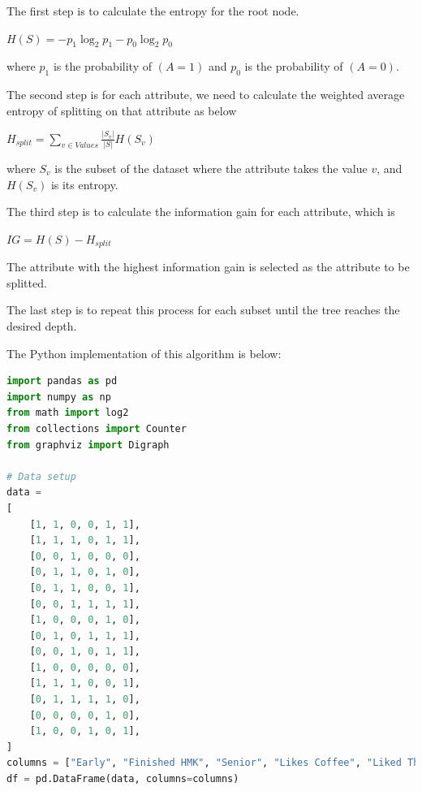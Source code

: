 \documentclass[12pt,letterpaper, onecolumn]{exam}
\begin{document}
\begin{questions}
\begin{parts}
\begin{solution}
        The first step is to calculate the entropy for the root node.

        \begin{center}
            $\displaystyle{H(S) = -p_1 \log_2 p_1 - p_0 \log_2 p_0}$
        \end{center}

        where $p_1$ is the probability of $(A=1)$ 
        and $p_0$ is the probability of $(A=0)$.

        The second step is for each attribute, we need to calculate the 
        weighted average entropy of splitting on that attribute as below

        \begin{center}
            $\displaystyle{H_{split} = \sum_{v \in Values} \frac{|S_v|}{|S|} H(S_v)}$
        \end{center}

        where $S_v$ is the subset of the dataset where the attribute takes 
        the value $v$, and $H(S_v)$ is its entropy.

        The third step is to calculate the information gain for each attribute, which is

        \begin{center}
            $\displaystyle{IG = H(S) - H_{split}}$
        \end{center}

        The attribute with the highest information gain is selected as the attribute to be splitted.

        The last step is to repeat this process for each subset until the tree reaches the desired depth.

        The Python implementation of this algorithm is below:

        \begin{lstlisting}[language=Python, style=mystyle]
import pandas as pd
import numpy as np
from math import log2
from collections import Counter
from graphviz import Digraph

# Data setup
data = 
[
    [1, 1, 0, 0, 1, 1],
    [1, 1, 1, 0, 1, 1],
    [0, 0, 1, 0, 0, 0],
    [0, 1, 1, 0, 1, 0],
    [0, 1, 1, 0, 0, 1],
    [0, 0, 1, 1, 1, 1],
    [1, 0, 0, 0, 1, 0],
    [0, 1, 0, 1, 1, 1],
    [0, 0, 1, 0, 1, 1],
    [1, 0, 0, 0, 0, 0],
    [1, 1, 1, 0, 0, 1],
    [0, 1, 1, 1, 1, 0],
    [0, 0, 0, 0, 1, 0],
    [1, 0, 0, 1, 0, 1],
]
columns = ["Early", "Finished HMK", "Senior", "Likes Coffee", "Liked The Last Jedi", "A"]
df = pd.DataFrame(data, columns=columns)


\end{lstlisting}
\end{solution}
\end{parts}
\end{questions}
\end{document}
